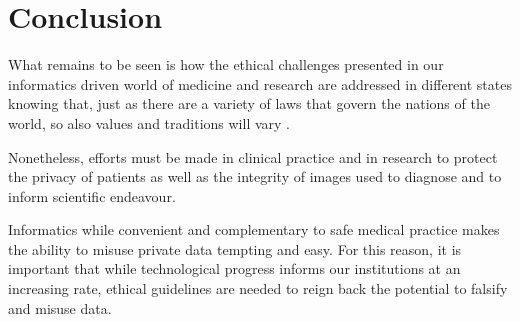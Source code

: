 \documentclass[british,a4paper, 12pt]{article}
\begin{document}
\section{Conclusion}

What remains to be seen is how the ethical challenges presented in our informatics driven
world of medicine and research are addressed in different states knowing that, just as there
are a variety of laws that govern the nations of the world, so also values and traditions will
vary \parencite{kluge2000professional}.

Nonetheless, efforts must be made in clinical practice and in research to protect the
privacy  of patients as well as the integrity of images used to diagnose and to inform
scientific endeavour.

Informatics while convenient and complementary to  safe medical practice makes the ability
to misuse private data tempting and easy. For this reason, it is important that while
technological progress informs our institutions at an increasing rate, ethical guidelines
are needed to reign back the potential to falsify and misuse data.


\printbibliography
\end{document}
